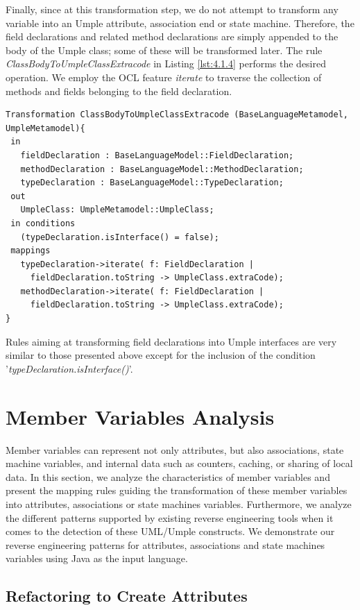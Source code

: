 Finally, since at this transformation step, we do not attempt to transform any variable into an Umple attribute, association end or state machine. Therefore, the field declarations and related method declarations are simply appended to the body of the Umple class; some of these will be transformed later. The rule \textit{ClassBodyToUmpleClassExtracode} in Listing \ref{lst:4.1.4} performs the desired operation. We employ the OCL feature \textit{iterate} to traverse the collection of methods and fields belonging to the field declaration. 

\begin{lstlisting}[style=mine,caption=Rule ClassBodyToUmpleClassExtracode,label=lst:4.1.4]
Transformation ClassBodyToUmpleClassExtracode (BaseLanguageMetamodel, UmpleMetamodel){ 
 in
   fieldDeclaration : BaseLanguageModel::FieldDeclaration;
   methodDeclaration : BaseLanguageModel::MethodDeclaration;
   typeDeclaration : BaseLanguageModel::TypeDeclaration;
 out
   UmpleClass: UmpleMetamodel::UmpleClass;
 in conditions
   (typeDeclaration.isInterface() = false);
 mappings
   typeDeclaration->iterate( f: FieldDeclaration | 
     fieldDeclaration.toString -> UmpleClass.extraCode);
   methodDeclaration->iterate( f: FieldDeclaration | 
     fieldDeclaration.toString -> UmpleClass.extraCode);
}
\end{lstlisting}

Rules aiming at transforming field declarations into Umple interfaces are very similar to those presented above except for the inclusion of the condition '\textit{typeDeclaration.isInterface()}'.

\section{Member Variables Analysis}
Member variables can represent not only attributes, but also associations, state machine variables, and internal data such as counters, caching, or sharing of local data. In this section, we analyze the characteristics of member variables and present the mapping rules guiding the transformation of
these member variables into attributes, associations or state machines variables. Furthermore, we analyze the different patterns supported by existing reverse engineering tools when it comes to the detection of these UML/Umple constructs. We demonstrate our reverse engineering patterns for attributes, associations and state machines variables using Java as the input language.  
\subsection{Refactoring to Create Attributes}
 
